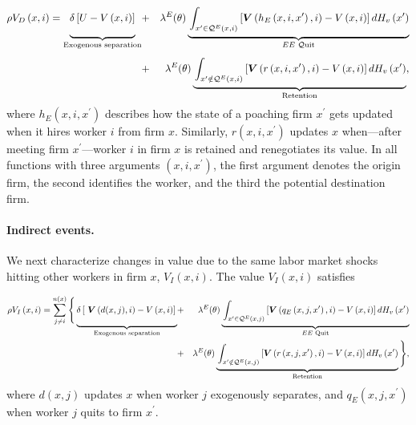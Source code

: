 {\small
\begin{eqnarray*}
\rho V_{D}\left( x,i\right) = \underbrace{\Bigg.\delta \left[ U-V\left(
x,i\right)\right]}_{\text{Exogenous separation}} &+& \lambda^E(\theta)
\underbrace{\Bigg.\int_{x^{\prime }\in \mathcal{Q}^{E}\left(x,i\right) }%
\left[ \bm{V}\left( h_{E}\left( x,i,x^{\prime }\right),i\right) -V\left(
x,i\right) \right] dH_v\left( x^{\prime }\right)}_{EE \text{ $\mathcal{Q}$uit}}
\\
&+& \lambda^E(\theta) \underbrace{\Bigg.\int_{x^{\prime }\notin \mathcal{Q}%
^{E}\left( x,i\right) }\left[ \bm{V}\left( r\left( x,i,x^{\prime
}\right) ,i\right) -V\left( x,i\right) \right] dH_v\left( x^{\prime }\right)}_{%
\text{Retention}},
\end{eqnarray*}%
}\noindent where $h_{E}\left( x,i,x^{\prime }\right) $ describes how the
state of a poaching firm $x^{\prime}$ gets updated when it hires worker $i$
from firm $x$. Similarly, $r\left( x,i,x^{\prime}\right)$ updates $x$ when---after meeting firm $x^\prime$---worker $i$ in firm $x$ is
retained and renegotiates its value.
In all functions with three arguments $\left( x,i,x^{\prime}\right)$, the
first argument denotes the origin firm, the second identifies the worker,
and the third the potential destination firm.

\paragraph{Indirect events.}

We next characterize changes in value due to the same labor market shocks hitting other workers in firm $x$, $V_{I}(x,i)$. The value $V_{I}(x,i)$ satisfies
\vspace{-0.1in}

{\small
\begin{eqnarray*}
\rho V_{I}\left( x,i\right) = \sum_{j\neq i}^{n\left( x\right)} \Bigg\{
\underbrace{\delta \left[ \bm{\ V}\left( d(x,j),i\right) -V\left(
x,i\right) \right]\Bigg.}_{\text{Exogenous separation}} &+& \lambda^E(\theta)%
\underbrace{\Bigg.\int_{x^{\prime }\in \mathcal{Q}^{E}\left( x,j\right) } %
\left[\bm{V} \left( q_{E}\left( x,j,x^{\prime }\right) ,i\right)
-V\left(x,i\right)\right] dH_v\left( x^{\prime }\right)}_{\text{$EE$ Quit}} \\
&+& \lambda^E(\theta)\underbrace{\Bigg.\int_{x^{\prime }\notin \mathcal{Q}%
^{E}\left( x,j\right) }\left[ \bm{V}\left( r\left( x,j,x^{\prime
}\right) ,i\right) -V\left( x,i\right) \right] dH_v\left( x^{\prime }\right)}_{%
\text{Retention}} \Bigg\},
\end{eqnarray*}%
}where $d(x,j)$ updates $x$ when worker $j$ exogenously separates, and $%
q_{E}\left( x,j,x^{\prime }\right) $ when worker $j$ quits to firm $%
x^{\prime}$.

